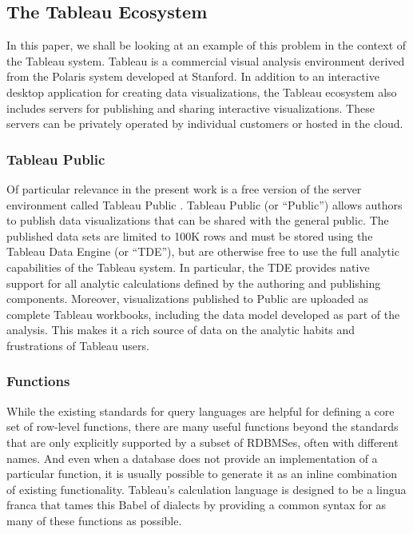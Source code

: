 \subsection{The Tableau Ecosystem}
In this paper, we shall be looking at an example of this problem in the context of the Tableau system. Tableau is a commercial visual analysis environment derived from the Polaris \cite{Polaris} system developed at Stanford. In addition to an interactive desktop application for creating data visualizations, the Tableau ecosystem also includes servers for publishing and sharing interactive visualizations. These servers can be privately operated by individual customers or hosted in the cloud. 

\subsubsection{Tableau Public}
Of particular relevance in the present work is a free version of the server environment called Tableau Public \cite{Public}. Tableau Public (or ``Public'') allows authors to publish data visualizations that can be shared with the general public. The published data sets are limited to 100K rows and must be stored using the Tableau Data Engine (or ``TDE'')\cite{TDE1,TDE2}, but are otherwise free to use the full analytic capabilities of the Tableau system. In particular, the TDE provides native support for all analytic calculations defined by the authoring and publishing components. Moreover, visualizations published to Public are uploaded as complete Tableau workbooks, including the data model developed as part of the analysis. This makes it a rich source of data on the analytic habits and frustrations of Tableau users.

\subsubsection{Functions}
While the existing standards for query languages are helpful for defining a core set of row-level functions, there are many useful functions beyond the standards that are only explicitly supported by a subset of RDBMSes, often with different names. And even when a database does not provide an implementation of a particular function, it is usually possible to generate it as an inline combination of existing functionality. Tableau's calculation language is designed to be a lingua franca that tames this Babel of dialects by providing a common syntax for as many of these functions as possible.

